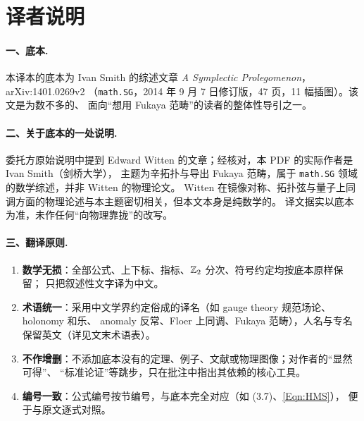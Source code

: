 \clearpage

\section*{译者说明}

\paragraph{一、底本.}
本译本的底本为 Ivan Smith 的综述文章 \emph{A Symplectic Prolegomenon}，arXiv:1401.0269v2
（\texttt{math.SG}，2014 年 9 月 7 日修订版，47 页，11 幅插图）。该文是为数不多的、
面向“想用 Fukaya 范畴”的读者的整体性导引之一。

\paragraph{二、关于底本的一处说明.}
委托方原始说明中提到 Edward Witten 的文章；经核对，本 PDF 的实际作者是 Ivan Smith（剑桥大学），
主题为辛拓扑与导出 Fukaya 范畴，属于 \texttt{math.SG} 领域的数学综述，并非 Witten 的物理论文。
Witten 在镜像对称、拓扑弦与量子上同调方面的物理论述与本主题密切相关，但本文本身是纯数学的。
译文据实以底本为准，未作任何“向物理靠拢”的改写。

\paragraph{三、翻译原则.}
\begin{enumerate}
  \item \textbf{数学无损}：全部公式、上下标、指标、$\mathbb{Z}_2$ 分次、符号约定均按底本原样保留；
        只把叙述性文字译为中文。
  \item \textbf{术语统一}：采用中文学界约定俗成的译名（如 gauge theory 规范场论、holonomy 和乐、
        anomaly 反常、Floer 上同调、Fukaya 范畴），人名与专名保留英文（详见文末术语表）。
  \item \textbf{不作增删}：不添加底本没有的定理、例子、文献或物理图像；对作者的“显然可得”、
        “标准论证”等跳步，只在批注中指出其依赖的核心工具。
  \item \textbf{编号一致}：公式编号按节编号，与底本完全对应（如 (3.7)、\eqref{Eqn:HMS}），
        便于与原文逐式对照。
\end{enumerate}

